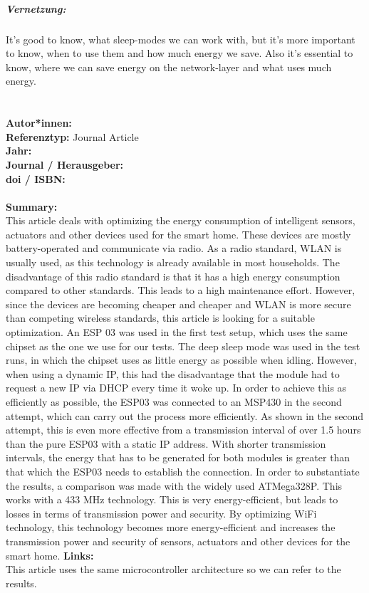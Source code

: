 \documentclass{report}
\newcommand{\createJournalArticleHeader}[1]{
    {\let\clearpage\relax \chapter{\citetitle{#1}}}
    \noindent
    \textbf{Autor*innen:} \citeauthor{#1} \\
    \textbf{Referenztyp:} Journal Article\\
    \textbf{Jahr:} \citeyear{#1} \\
    \textbf{Journal / Herausgeber:} \citefield{#1}{journaltitle}\\
    \textbf{doi / ISBN:} \citefield{#1}{doi} \\\\
    \textbf{Summary:}\\
}
\begin{document}
\paragraph{Vernetzung:}
It's good to know, what sleep-modes we can work with, but it's more important to know, when to use them and how much energy we save. Also it's essential to know, where we can save energy on the network-layer and what uses much energy.


\pagebreak

\createJournalArticleHeader{thomas_optimizing_2016}
This article deals with optimizing the energy consumption of intelligent sensors, actuators and other devices used for the smart home. These devices are mostly battery-operated and communicate via radio.\linebreak
As a radio standard, WLAN is usually used, as this technology is already available in most households. The disadvantage of this radio standard is that it has a high energy consumption compared to other standards. This leads to a high maintenance effort. However, since the devices are becoming cheaper and cheaper and WLAN is more secure than competing wireless standards, this article is looking for a suitable optimization.\linebreak
An ESP 03 was used in the first test setup, which uses the same chipset as the one we use for our tests.\linebreak
The deep sleep mode was used in the test runs, in which the chipset uses as little energy as possible when idling. However, when using a dynamic IP, this had the disadvantage that the module had to request a new IP via DHCP every time it woke up. In order to achieve this as efficiently as possible, the ESP03 was connected to an MSP430 in the second attempt, which can carry out the process more efficiently. As shown in the second attempt, this is even more effective from a transmission interval of over 1.5 hours than the pure ESP03 with a static IP address. With shorter transmission intervals, the energy that has to be generated for both modules is greater than that which the ESP03 needs to establish the connection. In order to substantiate the results, a comparison was made with the widely used ATMega328P. This works with a 433 MHz technology. This is very energy-efficient, but leads to losses in terms of transmission power and security. By optimizing WiFi technology, this technology becomes more energy-efficient and increases the transmission power and security of sensors, actuators and other devices for the smart home.\linebreak\linebreak
\textbf{Links:}\\
This article uses the same microcontroller architecture so we can refer to the results.
\pagebreak
	
\end{document}
